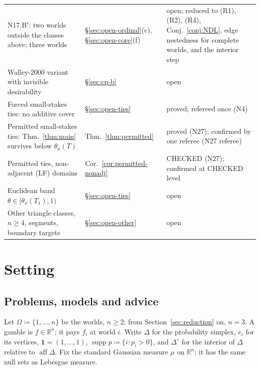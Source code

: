 \documentclass[11pt]{article}
\theoremstyle{definition}
\theoremstyle{remark}
\newcommand{\R}{\mathbb R}
\newcommand{\one}{\mathbf 1}
\newcommand{\Di}{\Delta^{\circ}}
\newcommand{\supp}{\operatorname{supp}}
\newcommand{\aff}{\operatorname{aff}}
\begin{document}
{\begin{longtable}{>{\raggedright\arraybackslash}p{6.4cm}>{\raggedright\arraybackslash}p{2.1cm}>{\raggedright\arraybackslash}p{5.6cm}}
N17.B$'$: two worlds outside the classes above; three worlds & \S\ref{sec:open-ordinal}(c), \S\ref{sec:open-core}(f) & open; reduced to (R1), (R2), (R4), Conj.~\ref{conj:NDL}, edge nestedness for complete worlds, and the interior step\\
Walley-2000 variant with invisible desirability & \S\ref{sec:cp-b} & open\\
Forced small-stakes ties: no additive cover & \S\ref{sec:open-ties} & proved; refereed once (N4)\\
Permitted small-stakes ties: Thm.~\ref{thm:main} survives below $\theta_x(T)$ & Thm.~\ref{thm:permitted} & proved (N27); confirmed by one referee (N27 referee)\\
Permitted ties, non-adjacent (LF) domains & Cor.~\ref{cor:permitted-nonadj} & CHECKED (N27); confirmed at CHECKED level\\
Euclidean band $\theta\in[\theta_x(T_1),1)$ & \S\ref{sec:open-ties} & open\\
Other triangle classes, $n\ge4$, segments, boundary targets & \S\ref{sec:open-other} & open\\
\bottomrule
\end{longtable}}

\section{Setting}\label{sec:setting}

\subsection{Problems, models and advice}
Let $\Omega\coloneqq\{1,\dots,n\}$ be the worlds, $n\ge2$; from Section~\ref{sec:reduction} on, $n=3$. A gamble is $f\in\R^n$; it pays $f_i$ at world $i$. Write $\Delta$ for the probability simplex, $e_i$ for its vertices, $\one=(1,\dots,1)$, $\supp p\coloneqq\{i:p_i>0\}$, and $\Di$ for the interior of $\Delta$ relative to $\aff\Delta$. Fix the standard Gaussian measure $\mu$ on $\R^n$; it has the same null sets as Lebesgue measure.
\end{document}
